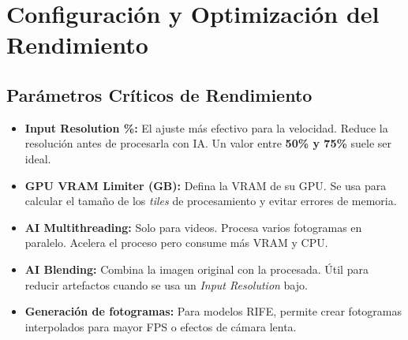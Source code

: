 \documentclass[11pt, a4paper]{article}
\begin{document}
\section{Configuración y Optimización del Rendimiento}

\subsection{Parámetros Críticos de Rendimiento}
\begin{itemize}[leftmargin=*]
    \item \textbf{Input Resolution \%:} El ajuste más efectivo para la velocidad. Reduce la resolución antes de procesarla con IA. Un valor entre \textbf{50\% y 75\%} suele ser ideal.
    \item \textbf{GPU VRAM Limiter (GB):} Defina la VRAM de su GPU. Se usa para calcular el tamaño de los \textit{tiles} de procesamiento y evitar errores de memoria.
    \item \textbf{AI Multithreading:} Solo para videos. Procesa varios fotogramas en paralelo. Acelera el proceso pero consume más VRAM y CPU.
    \item \textbf{AI Blending:} Combina la imagen original con la procesada. Útil para reducir artefactos cuando se usa un \textit{Input Resolution} bajo.
    \item \textbf{Generación de fotogramas:} Para modelos RIFE, permite crear fotogramas interpolados para mayor FPS o efectos de cámara lenta.
\end{itemize}
\end{document}
